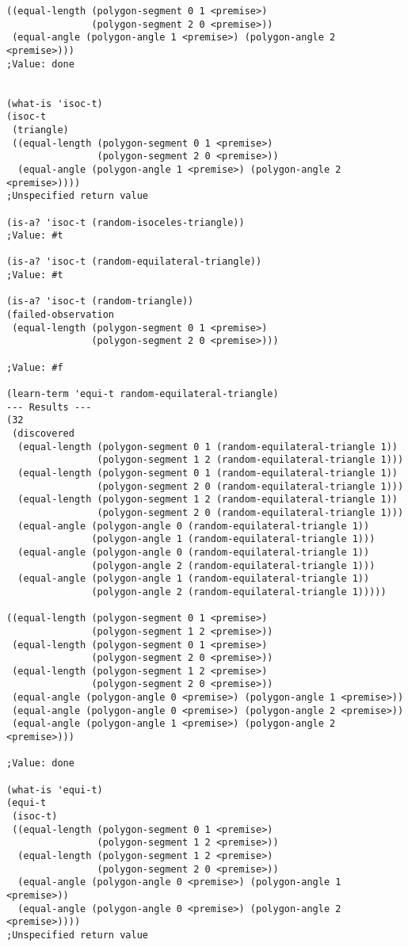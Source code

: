 \begin{verbatim}
((equal-length (polygon-segment 0 1 <premise>)
               (polygon-segment 2 0 <premise>))
 (equal-angle (polygon-angle 1 <premise>) (polygon-angle 2 <premise>)))
;Value: done


(what-is 'isoc-t)
(isoc-t
 (triangle)
 ((equal-length (polygon-segment 0 1 <premise>)
                (polygon-segment 2 0 <premise>))
  (equal-angle (polygon-angle 1 <premise>) (polygon-angle 2 <premise>))))
;Unspecified return value

(is-a? 'isoc-t (random-isoceles-triangle))
;Value: #t

(is-a? 'isoc-t (random-equilateral-triangle))
;Value: #t

(is-a? 'isoc-t (random-triangle))
(failed-observation
 (equal-length (polygon-segment 0 1 <premise>)
               (polygon-segment 2 0 <premise>)))

;Value: #f

(learn-term 'equi-t random-equilateral-triangle)
--- Results ---
(32
 (discovered
  (equal-length (polygon-segment 0 1 (random-equilateral-triangle 1))
                (polygon-segment 1 2 (random-equilateral-triangle 1)))
  (equal-length (polygon-segment 0 1 (random-equilateral-triangle 1))
                (polygon-segment 2 0 (random-equilateral-triangle 1)))
  (equal-length (polygon-segment 1 2 (random-equilateral-triangle 1))
                (polygon-segment 2 0 (random-equilateral-triangle 1)))
  (equal-angle (polygon-angle 0 (random-equilateral-triangle 1))
               (polygon-angle 1 (random-equilateral-triangle 1)))
  (equal-angle (polygon-angle 0 (random-equilateral-triangle 1))
               (polygon-angle 2 (random-equilateral-triangle 1)))
  (equal-angle (polygon-angle 1 (random-equilateral-triangle 1))
               (polygon-angle 2 (random-equilateral-triangle 1)))))

((equal-length (polygon-segment 0 1 <premise>)
               (polygon-segment 1 2 <premise>))
 (equal-length (polygon-segment 0 1 <premise>)
               (polygon-segment 2 0 <premise>))
 (equal-length (polygon-segment 1 2 <premise>)
               (polygon-segment 2 0 <premise>))
 (equal-angle (polygon-angle 0 <premise>) (polygon-angle 1 <premise>))
 (equal-angle (polygon-angle 0 <premise>) (polygon-angle 2 <premise>))
 (equal-angle (polygon-angle 1 <premise>) (polygon-angle 2 <premise>)))

;Value: done

(what-is 'equi-t)
(equi-t
 (isoc-t)
 ((equal-length (polygon-segment 0 1 <premise>)
                (polygon-segment 1 2 <premise>))
  (equal-length (polygon-segment 1 2 <premise>)
                (polygon-segment 2 0 <premise>))
  (equal-angle (polygon-angle 0 <premise>) (polygon-angle 1 <premise>))
  (equal-angle (polygon-angle 0 <premise>) (polygon-angle 2 <premise>))))
;Unspecified return value



\end{verbatim}
